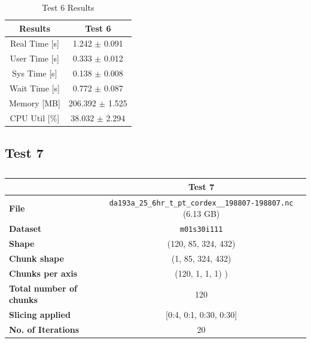 \documentclass{article}
\begin{document}
\begin{table}[h!]
    \centering
    \begin{tabular}{cc}
        \hline
        \textbf{Results} & Test 6              \\ \hline
        Real Time [s]    & 1.242 $\pm$ 0.091  \\
        User Time [s]    & 0.333 $\pm$ 0.012  \\
        Sys Time [s]     & 0.138 $\pm$ 0.008  \\
        Wait Time [s]    & 0.772 $\pm$ 0.087  \\
        Memory [MB]      & 206.392 $\pm$ 1.525\\
        CPU Util [\%]    & 38.032 $\pm$ 2.294 \\
        \hline
    \end{tabular}
    \caption{Test 6 Results}
    \label{tab:T6_Results}
\end{table}


\break
\subsection{Test 7}

\begin{table}[h!] 
    \centering 
    \begin{tabular}{lc}  \hline
                                        & Test 7                                         \\ \hline
        \textbf{File}                   & \texttt{da193a\_25\_6hr\_t\_pt\_cordex\_\_198807-198807.nc} (6.13 GB)   \\  
        \textbf{Dataset}                &\texttt{ m01s30i111  }                         \\ 
        \textbf{Shape}                  & (120, 85, 324, 432)                             \\ 
        \textbf{Chunk shape}            & (1, 85, 324, 432)                              \\ 
        \textbf{Chunks per axis}        &  (120, 1, 1, 1) )                               \\ 
        \textbf{Total number of chunks} & 120                                             \\ 
        \textbf{Slicing applied}        & [0:4, 0:1, 0:30, 0:30]                         \\ 
        \textbf{No. of Iterations}      & 20                                             \\  \hline
    \end{tabular}
    \caption{} 
    \label{tab:T7_Conditions} 
\end{table}
\end{document}
